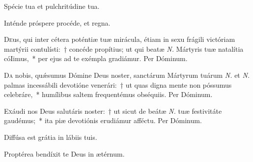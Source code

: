 \documentclass[vesperale_romanum.tex]{subfiles}
\begin{document}

\altertonus


\vel



\vv Spécie tua et pulchritúdine tua. \tpalleluia

\rr Inténde próspere procéde, et regna. \tpalleluia

\admagnificat

\label{an_simile_est_negotiatori_solesmes_1961}
{}


\lettrine{D}{e}us, qui inter cétera poténtiæ tuæ mirácula, étiam in sexu frágili vi\-ctóriam martýrii contulísti:~† concéde propítius; ut qui beatæ \textit{N.} Mártyris tuæ natalítia cóIimus,~* per ejus ad te exémpla gradiámur. Per Dóminum.


\lettrine{D}{a} nobis, quǽsumus Dómine Deus noster, san\-ctárum Mártyrum tuárum \textit{N.} et \textit{N.} palmas incessábili devotióne venerári:~† ut quas digna mente non póssumus celebráre,~* humílibus saltem frequentémus obséquiis. Per Dóminum.


\lettrine{E}{x}áudi nos Deus salutáris noster:~† ut sicut de beátæ \textit{N.} tuæ festivitáte gaudémus;~* ita piæ devotiónis erudiámur affé\-ctu.
Per Dóminum.


\omniapraeter %

\vv Diffúsa est grátia in lábiis tuis. \tpalleluia

\rr Proptérea bendíxit te Deus in ætérnum. \tpalleluia

\admagnificat
\label{an_manum_suam_solesmes_1961}
{}
\end{document}
